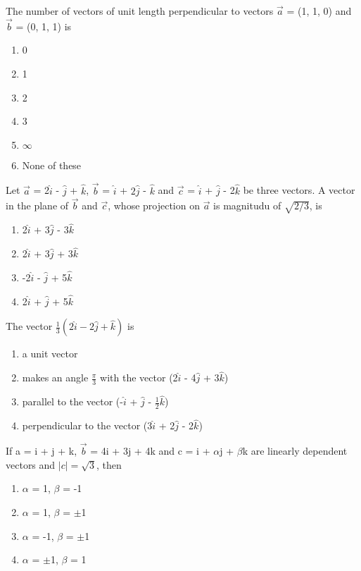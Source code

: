\item The number of vectors of unit length perpendicular to vectors $\overrightarrow{a}$ = (1, 1, 0) and $\overrightarrow{b}$ = (0, 1, 1) is
\begin{enumerate}
\item 0
\item 1
\item 2
\item 3
\item $\infty$
\item None of these
\end{enumerate}

\item Let $\overrightarrow{a}$ = 2$\hat{i}$ - $\hat{j}$ + $\hat{k}$, $\overrightarrow{b}$ = $\hat{i}$ + $2\hat{j}$ - $\hat{k}$ and $\overrightarrow{c}$ = $\hat{i}$ + $\hat{j}$ - 2$\hat{k}$ be three vectors. A vector in the plane of $\overrightarrow{b}$ and $\overrightarrow{c}$, whose projection on $\overrightarrow{a}$ is magnitudu of $\sqrt{2/3}$, is
\begin{enumerate}
\item 2$\hat{i}$ + 3$\hat{j}$ - 3$\hat{k}$
\item 2$\hat{i}$ + 3$\hat{j}$ + 3$\hat{k}$
\item -2$\hat{i}$ - $\hat{j}$ + 5$\hat{k}$
\item 2$\hat{i}$ + $\hat{j}$ + 5$\hat{k}$
\end{enumerate}

\item The vector $\frac{1}{3}(2\hat{i} - 2\hat{j} + \hat{k})$ is
\begin{enumerate}
\item a unit vector
\item makes an angle $\frac{\pi}{3}$ with the vector (2$\hat{i}$ - 4$\hat{j}$ + 3$\hat{k}$)
\item parallel to the vector (-$\hat{i}$ + $\hat{j}$ - $\frac{1}{2}\hat{k}$)
\item perpendicular to the vector (3$\hat{i}$ + 2$\hat{j}$ - 2$\hat{k}$)
\end{enumerate}

\item If a = i + j + k, $\overrightarrow{b}$ = 4i + 3j + 4k and c = i + $\alpha$j + $\beta$k are linearly dependent vectors and $|c|=\sqrt{3}$, then
\begin{enumerate}
\item $\alpha$ = 1, $\beta$ = -1
\item $\alpha$ = 1, $\beta$ = $\pm$1
\item $\alpha$ = -1, $\beta$ = $\pm$1
\item $\alpha$ = $\pm$1, $\beta$ = 1
\end{enumerate}

